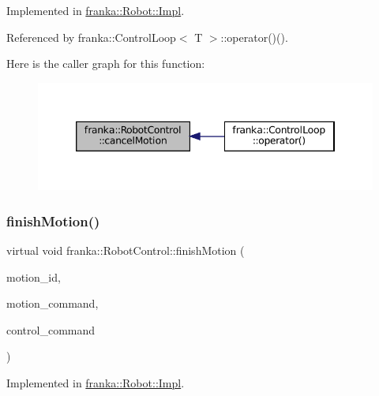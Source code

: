 Implemented in \hyperlink{classfranka_1_1Robot_1_1Impl_a30a3ca95296656edb350c49808c74385}{franka\+::\+Robot\+::\+Impl}.



Referenced by franka\+::\+Control\+Loop$<$ T $>$\+::operator()().

Here is the caller graph for this function\+:
\nopagebreak
\begin{figure}[H]
\begin{center}
\leavevmode
\includegraphics[width=346pt]{classfranka_1_1RobotControl_a8eb19b5e21e2ac8d9c98bffe2dd9124d_icgraph}
\end{center}
\end{figure}
\mbox{\label{classfranka_1_1RobotControl_aae1629178b5eeb5d8e4d41d2f746f2fc}} 
\subsubsection{\texorpdfstring{finish\+Motion()}{finishMotion()}}
{\footnotesize\ttfamily virtual void franka\+::\+Robot\+Control\+::finish\+Motion (\begin{DoxyParamCaption}\item[{uint32\+\_\+t}]{motion\+\_\+id,  }\item[{const \hyperlink{structresearch__interface_1_1robot_1_1MotionGeneratorCommand}{research\+\_\+interface\+::robot\+::\+Motion\+Generator\+Command} $\ast$}]{motion\+\_\+command,  }\item[{const \hyperlink{structresearch__interface_1_1robot_1_1ControllerCommand}{research\+\_\+interface\+::robot\+::\+Controller\+Command} $\ast$}]{control\+\_\+command }\end{DoxyParamCaption})\hspace{0.3cm}{\ttfamily [pure virtual]}}



Implemented in \hyperlink{classfranka_1_1Robot_1_1Impl_a024cc4b7994e164a1468b4dd222f80ab}{franka\+::\+Robot\+::\+Impl}.



